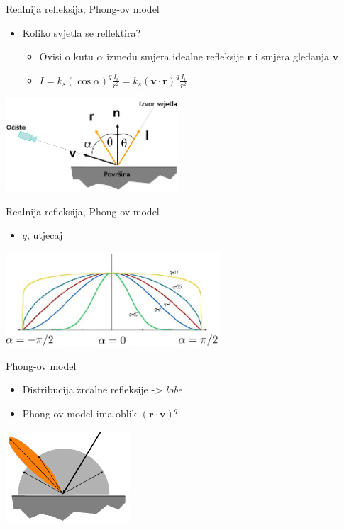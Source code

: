 \documentclass[9pt]{beamer}
\begin{document}
\begin{frame}{Realnija refleksija, Phong-ov model}
	\begin{itemize} %
		\item Koliko svjetla se reflektira?
		\begin{itemize}
			\item Ovisi o kutu $\alpha$ između smjera idealne refleksije $\mathbf{r}$ i smjera gledanja $\mathbf{v}$
			\item $I = k_s\left(\cos \alpha\right)^q\frac{I_i}{r^2} = 
			k_s\left(\mathbf{v}\cdot \mathbf{r}\right)^q\frac{I_i}{r^2}$
		\end{itemize}
	\end{itemize}
	\begin{center}
		\includegraphics[height=3.5cm]{slike/phong_model.png}
	\end{center}
\end{frame}

\begin{frame}{Realnija refleksija, Phong-ov model}
	\begin{itemize}
		\item $q$, utjecaj
	\end{itemize}
	\begin{center}
		\includegraphics[height=3.5cm]{slike/specular_q_coeff.png}
	\end{center}
\end{frame}

\begin{frame}{Phong-ov model}
	\begin{itemize}
		\item Distribucija zrcalne refleksije -> \textsl{lobe}
		\item Phong-ov model ima oblik $ (\mathbf{r}\cdot \mathbf{v})^q$
	\end{itemize}
	\begin{center}
		\includegraphics[height=3.5cm]{slike/phong_model_complete.png}
	\end{center}
\end{frame}
\end{document}

